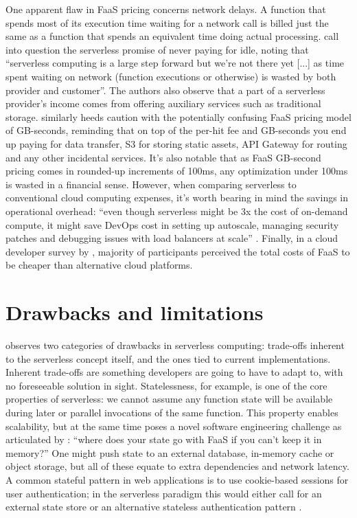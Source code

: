One apparent flaw in FaaS pricing concerns network delays. A function that spends most of its execution time waiting for a network call is billed just the same as a function that spends an equivalent time doing actual processing. \textcite{fox17} call into question the serverless promise of never paying for idle, noting that ``serverless computing is a large step forward but we're not there yet [...] as time spent waiting on network (function executions or otherwise) is wasted by both provider and customer''. The authors also observe that a part of a serverless provider's income comes from offering auxiliary services such as traditional storage. \textcite{eivy2017wary} similarly heeds caution with the potentially confusing FaaS pricing model of GB-seconds, reminding that on top of the per-hit fee and GB-seconds you end up paying for data transfer, S3 for storing static assets, API Gateway for routing and any other incidental services. It's also notable that as FaaS GB-second pricing comes in rounded-up increments of 100ms, any optimization under 100ms is wasted in a financial sense. However, when comparing serverless to conventional cloud computing expenses, it's worth bearing in mind the savings in operational overhead: ``even though serverless might be 3x the cost of on-demand compute, it might save DevOps cost in setting up autoscale, managing security patches and debugging issues with load balancers at scale'' \parencite{eivy2017wary}. Finally, in a cloud developer survey by \textcite{leitner18industrialpractice}, majority of participants perceived the total costs of FaaS to be cheaper than alternative cloud platforms.

\section{Drawbacks and limitations} \label{sec:limitations}

\textcite{robert2016serverlessarchitectures} observes two categories of drawbacks in serverless computing: trade-offs inherent to the serverless concept itself, and the ones tied to current implementations. Inherent trade-offs are something developers are going to have to adapt to, with no foreseeable solution in sight. Statelessness, for example, is one of the core properties of serverless: we cannot assume any function state will be available during later or parallel invocations of the same function. This property enables scalability, but at the same time poses a novel software engineering challenge as articulated by \textcite{robert2016serverlessarchitectures}: ``where does your state go with FaaS if you can’t keep it in memory?'' One might push state to an external database, in-memory cache or object storage, but all of these equate to extra dependencies and network latency. A common stateful pattern in web applications is to use cookie-based sessions for user authentication; in the serverless paradigm this would either call for an external state store or an alternative stateless authentication pattern \parencite{hendrickson16openlambda}.


